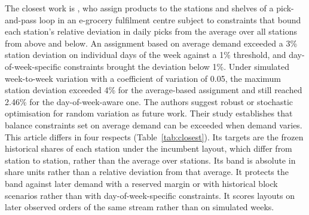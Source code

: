 The closest work is \citet{winkelmann2025integrated}, who assign products to the stations and shelves of a pick-and-pass loop in an e-grocery fulfilment centre subject to constraints that bound each station's relative deviation in daily picks from the average over all stations from above and below. An assignment based on average demand exceeded a 3\% station deviation on individual days of the week against a 1\% threshold, and day-of-week-specific constraints brought the deviation below 1\%. Under simulated week-to-week variation with a coefficient of variation of 0.05, the maximum station deviation exceeded 4\% for the average-based assignment and still reached 2.46\% for the day-of-week-aware one. The authors suggest robust or stochastic optimisation for random variation as future work. Their study establishes that balance constraints set on average demand can be exceeded when demand varies. This article differs in four respects (Table~\ref{tab:closest}). Its targets are the frozen historical shares of each station under the incumbent layout, which differ from station to station, rather than the average over stations. Its band is absolute in share units rather than a relative deviation from that average. It protects the band against later demand with a reserved margin or with historical block scenarios rather than with day-of-week-specific constraints. It scores layouts on later observed orders of the same stream rather than on simulated weeks.

